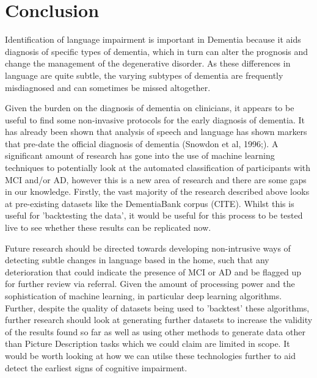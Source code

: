 \documentclass[a4paper]{article}
\begin{document}
\section{Conclusion}
\par
Identification of language impairment is important in Dementia because it aids diagnosis of specific types of dementia, which in turn can alter the prognosis and change the management of the degenerative disorder. As these differences in language are quite subtle, the varying subtypes of dementia are frequently misdiagnosed and can sometimes be missed altogether. 
\newline
\par 
Given the burden on the diagnosis of dementia on clinicians, it appears to be useful to find some non-invasive protocols for the early diagnosis of dementia. It has already been shown that analysis of speech and language has shown markers that pre-date the official diagnosis of dementia (Snowdon et al, 1996;)\cite{Berisha2015}. A significant amount of research has gone into the use of machine learning techniques to potentially look at the automated classification of participants with MCI and/or AD, however this is a new area of research and there are some gaps in our knowledge. Firstly, the vast majority of the research described above looks at pre-existing datasets like the DementiaBank corpus (CITE). Whilst this is useful for 'backtesting the data', it would be useful for this process to be tested live to see whether these results can be replicated now. \newline 
\par
Future research should be directed towards developing non-intrusive ways of detecting subtle changes in language based in the home, such that any deterioration that could indicate the presence of MCI or AD and be flagged up for further review via referral. Given the amount of processing power and the sophistication of machine learning, in particular deep learning algorithms. Further, despite the quality of datasets being used to 'backtest' these algorithms, further research should look at generating further datasets to increase the validity of the results found so far as well as using other methods to generate data other than Picture Description tasks which we could claim are limited in scope. It would be worth looking at how we can utilse these technologies further to aid detect the earliest signs of cognitive impairment.  



\end{document}
